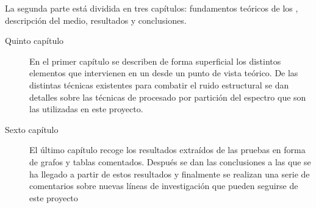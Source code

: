La segunda parte está dividida en tres capítulos: fundamentos teóricos de los , descripción del medio, resultados y conclusiones.

\begin{description}
	\item[Quinto capítulo] En el primer capítulo se describen de forma superficial los distintos elementos que intervienen en un  desde un punto de vista teórico. De las distintas técnicas existentes para combatir el ruido estructural se dan detalles sobre las técnicas de procesado por partición del espectro que son las utilizadas en este proyecto.
	\item[Sexto capítulo] El último capítulo recoge los resultados extraídos de las pruebas en forma de grafos y tablas comentados. Después se dan las conclusiones a las que se ha llegado a partir de estos resultados y finalmente se realizan una serie de comentarios sobre nuevas líneas de investigación que pueden seguirse de este proyecto
\end{description}

